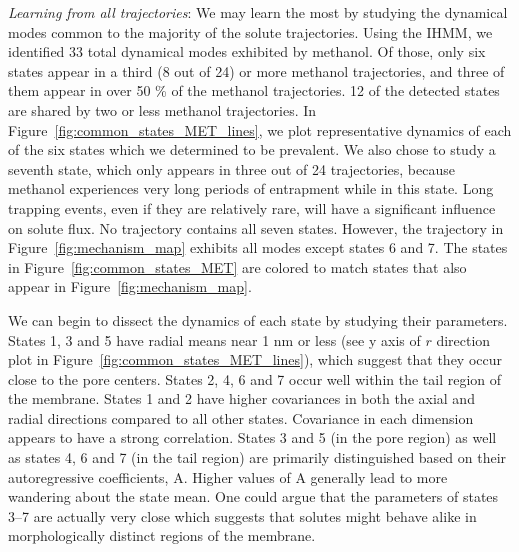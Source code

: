 \documentclass[journal=jpcbfk,manuscript=article]{achemso}
\begin{document}
  \textit{Learning from all trajectories}: We may learn the most by studying the
  dynamical modes common to the majority of 
  the solute trajectories. Using the IHMM, we identified 33 total dynamical modes 
  exhibited by methanol. Of those, only six states appear in a third (8 out of 24) 
  or more methanol trajectories, and three of them appear in over 50 \% of the 
  methanol trajectories. 12 of the detected states are shared by two or less 
  methanol trajectories. In Figure~\ref{fig:common_states_MET_lines}, we plot 
  representative dynamics of each of the six states which we determined to be prevalent.
  We also chose to study a seventh state, which only appears in three out of
  24 trajectories, because methanol experiences very long periods of entrapment
  while in this state. Long trapping events, even if they are relatively rare, will
  have a significant influence on solute flux. No trajectory contains all seven states.
  However, the trajectory in Figure~\ref{fig:mechanism_map} exhibits all modes except
  states 6 and 7. The states in Figure~\ref{fig:common_states_MET} are colored to match
  states that also appear in Figure~\ref{fig:mechanism_map}.
  
  We can begin to dissect the dynamics of each state by studying their parameters.
  States 1, 3 and 5 have radial means near 1 nm or less (see y axis of $r$ direction 
  plot in Figure~\ref{fig:common_states_MET_lines}), which suggest that they occur
  close to the pore centers. States 2, 4, 6 and 7 occur well within the tail region
  of the membrane. States 1 and 2 have higher covariances in both the axial and radial
  directions compared to all other states. Covariance in each dimension appears to have
  a strong correlation. States 3 and 5 (in the pore region) as well as states 4, 6 and
  7 (in the tail region) are primarily distinguished based on their autoregressive 
  coefficients, A. Higher values of A generally lead to more wandering about the state
  mean. One could argue that the parameters of states 3--7 are actually very close which
  suggests that solutes might behave alike in morphologically distinct regions of the 
  membrane.
\end{document}

